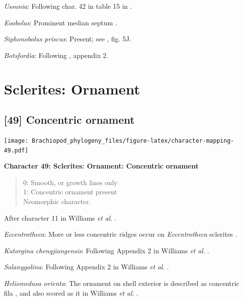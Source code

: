 \documentclass[]{book}
\theoremstyle{definition}
\theoremstyle{definition}
\theoremstyle{definition}
\theoremstyle{remark}
\begin{document}
\emph{Ussunia}: Following char. 42 in table 15 in
\citet{Williams2000BrachiopodaLinguliformea}.

\emph{Eoobolus}: Prominent median septum \citep[fig. 4d, e
in][]{Balthasar2009Thebrachiopod}.

\emph{Siphonobolus priscus}: Present; see
\citet{Popov2009Earlyontogeny}, fig. 5J.

\emph{Botsfordia}: Following \citet{Williams1998Thediversity}, appendix
2.

\hypertarget{sclerites-ornament}{%
\section{Sclerites: Ornament}\label{sclerites-ornament}}

\hypertarget{concentric-ornament}{%
\subsection*{{[}49{]} Concentric ornament}\label{concentric-ornament}}

\texttt{[image: Brachiopod\_phylogeny\_files/figure-latex/character-mapping-49.pdf]}

\textbf{Character 49: Sclerites: Ornament: Concentric ornament}

\begin{quote}
0: Smooth, or growth lines only\\
1: Concentric ornament present\\
Neomorphic character.
\end{quote}

After character 11 in Williams \emph{et al}.
\citeyearpar{Williams1998Thediversity}.

\emph{Eccentrotheca}: More or less concentric ridges occur on
\emph{Eccentrotheca} sclerites
\citep{Skovsted2011Scleritomeconstruction}.

\emph{Kutorgina chengjiangensis}: Following Appendix 2 in Williams
\emph{et al}. \citeyearpar{Williams1998Thediversity}.

\emph{Salanygolina}: Following Appendix 2 in Williams \emph{et al}.
\citeyearpar{Williams1998Thediversity}.

\emph{Heliomedusa orienta}: The ornament on shell exterior is described
as concentric fila \citep[P.43]{Chen2007Reinterpretationof}, and also
scored as it in Williams \emph{et al}.
\citeyearpar[pp.160--163]{Williams2000BrachiopodaLinguliformea}.
\end{document}
